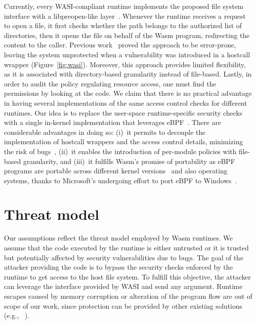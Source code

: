 Currently, every WASI-compliant runtime implements the proposed file system
interface with a libpreopen-like layer~\cite{libpreopen}. Whenever the runtime
receives a request to open a file, it first checks whether the path
belongs to the authorized list of directories, then it opens the file
on behalf of the Wasm program, redirecting the content to the caller.
Previous work~\cite{johnson2022wave,
  bosamiya2022provably, lehmann2020everything} proved the approach
to be error-prone, leaving the system unprotected when a vulnerability
was introduced in a hostcall wrapper (Figure~\ref{fig:wasi}). Moreover,
this approach provides limited flexibility, as it is associated with
directory-based granularity instead of file-based. Lastly, in order to audit
the policy regulating resource access, one must find the permissions
by looking at the code.
We claim that there is no practical advantage in having several
implementations of the same access control checks for different
runtimes. Our idea is to replace the user-space runtime-specific
security checks with a single in-kernel implementation that leverages
eBPF~\cite{bpf-lsm-hooks}.
There are considerable advantages in doing so: (i)~it permits to decouple the implementation of hostcall wrappers
and the access control details, minimizing the risk of bugs~\cite{kehoe2022ebpf,seapp, cage4deno},
(ii)~it enables the introduction of per-module policies with file-based
granularity, and (iii)~it fulfills Wasm's promise of portability as eBPF programs are portable across different kernel versions~\cite{andrii2021bpfCORE} and also operating systems, thanks
to Microsoft's undergoing effort to port eBPF to
Windows~\cite{ebpf-windows}.

\section{Threat model}
\label{sect:wasm:threat-model}

Our assumptions reflect the threat model employed by Wasm runtimes. We
assume that the code executed by the runtime is either untrusted or it
is trusted but potentially affected by security vulnerabilities due to
bugs. The goal of the attacker providing the code is to bypass the
security checks enforced by the runtime to get access to the host file
system. To fulfill this objective, the attacker can leverage the
interface provided by WASI and send any argument. Runtime escapes
caused by memory corruption or alteration of the program flow are out
of scope of our work, since protection can be provided by other
existing solutions (e.g., ~\cite{bosamiya2022provably}).

